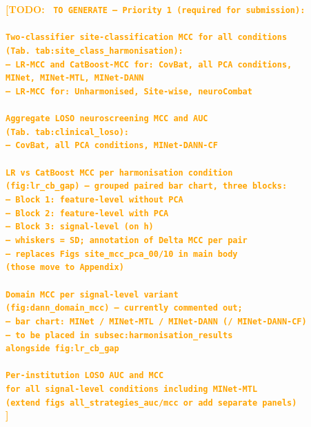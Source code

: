 \documentclass[preprint,12pt]{elsarticle}
\newcommand{\td}[1]{\textcolor{orange}{\textbf{[TODO: #1]}}}
\begin{document}
\td{
\texttt{
TO GENERATE --- Priority 1 (required for submission):\\
\\
\quad [Table 3] Two-classifier site-classification MCC for all conditions\\
\quad\quad (Tab.~tab:site\_class\_harmonisation):\\
\quad\quad -- LR-MCC and CatBoost-MCC for: CovBat, all PCA conditions,\\
\quad\quad\quad MINet, MINet-MTL, MINet-DANN\\
\quad\quad -- LR-MCC for: Unharmonised, Site-wise, neuroCombat\\
\\
\quad [Table 4] Aggregate LOSO neuroscreening MCC and AUC\\
\quad\quad (Tab.~tab:clinical\_loso):\\
\quad\quad -- CovBat, all PCA conditions, MINet-DANN-CF\\
\\
\quad [Figure A] LR vs CatBoost MCC per harmonisation condition\\
\quad\quad (fig:lr\_cb\_gap) -- grouped paired bar chart, three blocks:\\
\quad\quad -- Block 1: feature-level without PCA\\
\quad\quad -- Block 2: feature-level with PCA\\
\quad\quad -- Block 3: signal-level (on h)\\
\quad\quad -- whiskers = SD; annotation of Delta MCC per pair\\
\quad\quad -- replaces Figs site\_mcc\_pca\_00/10 in main body\\
\quad\quad\quad (those move to Appendix)\\
\\
\quad [Figure B] Domain MCC per signal-level variant\\
\quad\quad (fig:dann\_domain\_mcc) -- currently commented out;\\
\quad\quad -- bar chart: MINet / MINet-MTL / MINet-DANN (/ MINet-DANN-CF)\\
\quad\quad -- to be placed in subsec:harmonisation\_results\\
\quad\quad\quad alongside fig:lr\_cb\_gap\\
\\
\quad [Figure C+D] Per-institution LOSO AUC and MCC\\
\quad\quad for all signal-level conditions including MINet-MTL\\
\quad\quad (extend figs all\_strategies\_auc/mcc or add separate panels)\\
}}
\end{document}
